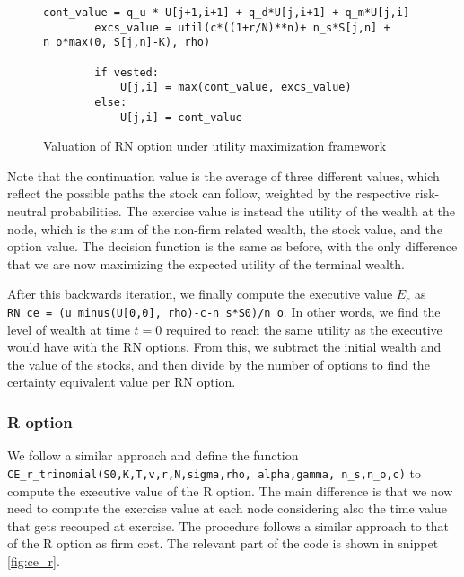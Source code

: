 \begin{figure}[H]
    \begin{lstlisting}[breaklines, basicstyle=\ttfamily\small]
        cont_value = q_u * U[j+1,i+1] + q_d*U[j,i+1] + q_m*U[j,i]
        excs_value = util(c*((1+r/N)**n)+ n_s*S[j,n] + n_o*max(0, S[j,n]-K), rho)
        
        if vested:
            U[j,i] = max(cont_value, excs_value)
        else: 
            U[j,i] = cont_value
    \end{lstlisting}
 \label{fig:ce_rn}
 \caption{Valuation of RN option under utility maximization framework}
\end{figure}

Note that the continuation value is the average of three different values, which reflect the possible paths the stock can follow, weighted by the respective risk-neutral probabilities. The exercise value is instead the utility of the wealth at the node, which is the sum of the non-firm related wealth, the stock value, and the option value. The decision function is the same as before, with the only difference that we are now maximizing the expected utility of the terminal wealth.

After this backwards iteration, we finally compute the executive value $E_c$ as \\
\verb|RN_ce = (u_minus(U[0,0], rho)-c-n_s*S0)/n_o|.
In other words, we find the level of wealth at time $t=0$ required to reach the same utility as the executive would have with the RN options. From this, we subtract the initial wealth and the value of the stocks, and then divide by the number of options to find the certainty equivalent value per RN option.

\subsubsection{R option}
We follow a similar approach and define the function\\
\verb|CE_r_trinomial(S0,K,T,v,r,N,sigma,rho, alpha,gamma, n_s,n_o,c)| to compute the executive value of the R option. The main difference is that we now need to compute the exercise value at each node considering also the time value that gets recouped at exercise. The procedure follows a similar approach to that of the R option as firm cost. The relevant part of the code is shown in snippet \ref*{fig:ce_r}.


